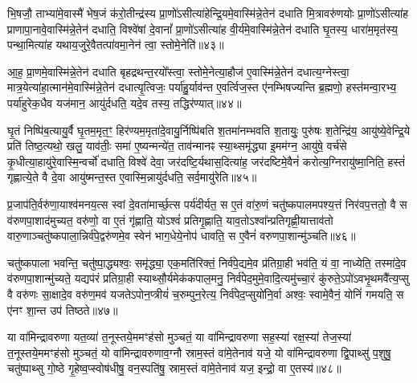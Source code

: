 भि॒षजौ॒ ताभ्या॑मे॒वास्मै॑ भेष॒जं क॑रो॒तीन्द्र॑स्य प्रा॒णो॑\-ऽसीत्या॑हेन्द्रि॒यमे॒वास्मि॑न्ने॒तेन॑ दधाति मि॒त्रावरु॑णयोः प्रा॒णो॑\-ऽसीत्या॑ह प्राणापा॒नावे॒वास्मि॑न्ने॒तेन॑ दधाति॒ विश्वे॑षां दे॒वानां᳚ प्रा॒णो॑\-ऽसीत्या॑ह वी॒र्य॑मे॒वास्मि॑न्ने॒तेन॑ दधाति घृ॒तस्य॒ धारा॑म॒मृत॑स्य॒ पन्था॒मित्या॑ह यथाय॒जुरे॒वैतत्पा॑वमा॒नेन॑ त्वा॒ स्तोमे॒नेति॑॥४३॥

आ॒ह॒ प्रा॒णमे॒वास्मि॑न्ने॒तेन॑ दधाति बृहद्रथन्त॒रयो᳚स्त्वा॒ स्तोमे॒नेत्या॒हौज॑ ए॒वास्मि॑न्ने॒तेन॑ दधात्य॒ग्नेस्त्वा॒ मात्र॒येत्या॑हा॒त्मान॑मे॒वास्मि॑न्ने॒तेन॑ दधात्यृ॒त्विजः॒ पर्या॑हु॒र्याव॑न्त ए॒वर्त्विज॒स्त ए॑नम्भिषज्यन्ति ब्र॒ह्मणो॒ हस्त॑मन्वा॒रभ्य॒ पर्या॑हुरेक॒धैव यज॑मान॒ आयु॑र्दधति॒ यदे॒व तस्य॒ तद्धिर॑ण्यात्॥४४॥

घृ॒तं निष्पि॑ब॒त्यायु॒र्वै घृ॒तम॒मृत॒ꣳ॒ हिर॑ण्यम॒मृता॑दे॒वायु॒र्निष्पि॑बति श॒तमा॑नम्भवति श॒तायुः॒ पुरु॑षः श॒तेन्द्रि॑य॒ आयु॑ष्ये॒वेन्द्रि॒ये प्रति॑ तिष्ठ॒त्यथो॒ खलु॒ याव॑तीः॒ समा॑ ए॒ष्यन्मन्ये॑त॒ ताव॑न्मानꣴ स्या॒थ्समृ॑द्ध्या इ॒मम॑ग्न॒ आयु॑षे॒ वर्च॑से कृ॒धीत्या॒हायु॑रे॒वास्मि॒न्वर्चो॑ दधाति॒ विश्वे॑ देवा॒ जर॑दष्टि॒र्यथास॒दित्या॑ह॒ जर॑दष्टिमे॒वैनं॑ करोत्य॒ग्निरायु॑ष्मा॒निति॒ हस्तं॑ गृह्णात्ये॒ते वै दे॒वा आयु॑ष्मन्त॒स्त ए॒वास्मि॒न्नायु॑र्दधति॒ सर्व॒मायु॑रेति॥४५॥

{\anuvakamend[{रसं॑ दे॒वाना॒ꣳ॒ स्तोमे॒नेति॒ हिर॑ण्या॒दस॒दिति॒ द्वाविꣳ॑शतिश्च॥11॥}]}

प्र॒जाप॑ति॒र्वरु॑णा॒याश्व॑मनय॒त्स स्वां दे॒वता॑मार्च्छ॒त्स पर्य॑दीर्यत॒ स ए॒तं वा॑रु॒णं चतु॑ष्कपालमपश्य॒त्तं निर॑वप॒त्ततो॒ वै स व॑रुणपा॒शाद॑मुच्यत॒ वरु॑णो॒ वा ए॒तं गृ॑ह्णाति॒ यो\-ऽश्वं॑ प्रतिगृ॒ह्णाति॒ याव॒तो\-ऽश्वा᳚न्प्रतिगृह्णी॒यात्ताव॑तो वारु॒णाञ्चतु॑ष्कपाला॒न्निर्व॑पे॒द्वरु॑णमे॒व स्वेन॑ भाग॒धेये॒नोप॑ धावति॒ स ए॒वैनं॑ वरुणपा॒शान्मु॑ञ्चति॥४६॥

चतु॑ष्कपाला भवन्ति॒ चतु॑ष्पा॒द्ध्यश्वः॒ समृ॑द्ध्या॒ एक॒मति॑रिक्तं॒ निर्व॑पे॒द्यमे॒व प्र॑तिग्रा॒ही भव॑ति॒ यं वा॒ नाध्येति॒ तस्मा॑दे॒व व॑रुणपा॒शान्मु॑च्यते॒ यद्यप॑रं प्रतिग्रा॒ही स्याथ्सौ॒र्यमेक॑कपाल॒मनु॒ निर्व॑पेद॒मुमे॒वादि॒त्यमु॑च्चा॒रं कु॑रुते॒\-ऽपो॑\-ऽवभृ॒थमवै᳚त्य॒प्सु वै वरु॑णः सा॒क्षादे॒व वरु॑ण॒मव॑ यजते\-ऽपोन॒प्त्रीयं॑ च॒रुम्पुन॒रेत्य॒ निर्व॑पेद॒प्सुयो॑नि॒र्वा अश्वः॒ स्वामे॒वैनं॒ योनिं॑ गमयति॒ स ए॑नꣳ शा॒न्त उप॑ तिष्ठते॥४७॥

{\anuvakamend[{मु॒ञ्च॒ति॒ च॒रुꣳ स॒प्तद॑श च॥12॥}]}

या वा॑मिन्द्रावरुणा यत॒व्या॑ त॒नूस्तये॒ममꣳह॑सो मुञ्चतं॒ या वा॑मिन्द्रावरुणा सह॒स्या॑ रक्ष॒स्या॑ तेज॒स्या॑ त॒नूस्तये॒ममꣳह॑सो मुञ्चतं॒ यो वा॑मिन्द्रावरुणाव॒ग्नौ स्राम॒स्तं वा॑मे॒तेनाव॑ यजे॒ यो वा॑मिन्द्रावरुणा द्वि॒पाथ्सु॑ प॒शुषु॒ चतु॑ष्पाथ्सु गो॒ष्ठे गृ॒हेष्व॒प्स्वोष॑धीषु॒ वन॒स्पति॑षु॒ स्राम॒स्तं वा॑मे॒तेनाव॑ यज॒ इन्द्रो॒ वा ए॒तस्य॑॥४८॥

